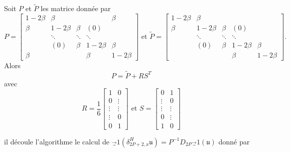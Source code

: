 \begin{proposition}
Soit $P$ et $\tilde{P}$ les matrice donnée par 
\begin{equation}
P = \begin{bmatrix}
  1 - 2 \beta & \beta &   &   & \beta \\ 
  \beta & 1 - 2 \beta & \beta & (0) &   \\ 
    & \ddots & \ddots & \ddots &   \\ 
    & (0) & \beta & 1 - 2 \beta & \beta \\ 
  \beta &   &   & \beta & 1 - 2 \beta
  \end{bmatrix}  \text{ et }
\tilde{P} = 
\begin{bmatrix}
  1 - 2 \beta & \beta &   &   &  \\ 
  \beta & 1 - 2 \beta & \beta & (0) &   \\ 
    & \ddots & \ddots & \ddots &   \\ 
    & (0) & \beta & 1 - 2 \beta & \beta \\ 
   &   &   & \beta & 1 - 2 \beta
  \end{bmatrix} .
\end{equation}
Alors 
\begin{equation}
P = \tilde{P} + R S^T
\end{equation} 
avec 
\begin{equation}
R = \dfrac{1}{6}\begin{bmatrix}
1 & 0 \\ 
0 & \vdots \\ 
\vdots & \vdots \\ 
\vdots & 0 \\ 
0 & 1
\end{bmatrix} \text{ et } 
S = \begin{bmatrix}
0 & 1 \\ 
\vdots & 0 \\ 
\vdots & \vdots \\ 
0 & \vdots \\ 
1 & 0
\end{bmatrix} 
\end{equation}
\end{proposition}

il découle l'algorithme le calcul de $\vec_1 (\delta_{2P+2,x}^H \mathfrak{u}) = P^{-1}D_{2P} \vec_1 (\mathfrak{u})$ donné par

